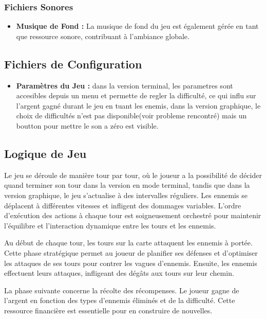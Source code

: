 \documentclass{article}
\begin{document}
\subsubsection*{Fichiers Sonores}

\begin{itemize}
    \item \textbf{Musique de Fond :} La musique de fond du jeu est également gérée en tant que ressource sonore, contribuant à l'ambiance globale.
\end{itemize}

\subsection{Fichiers de Configuration}

\begin{itemize}
    \item \textbf{Paramètres du Jeu :} dans la version terminal, les parametres sont accesibles depuis un menu et permette de regler la difficulté, ce qui influ sur l'argent gagné durant le jeu en tuant les enemis, dans la version graphique, le choix de difficultés n'est pas disponible(voir probleme rencontré) mais un boutton pour mettre le son a zéro est visible.
\end{itemize}


\subsection{Logique de Jeu}
Le jeu se déroule de manière tour par tour, où le joueur a la possibilité de décider quand terminer son tour dans la version en mode terminal, tandis que dans la version graphique, le jeu s'actualise à des intervalles réguliers. Les ennemis se déplacent à différentes vitesses et infligent des dommages variables. L'ordre d'exécution des actions à chaque tour est soigneusement orchestré pour maintenir l'équilibre et l'interaction dynamique entre les tours et les ennemis.

Au début de chaque tour, les tours sur la carte attaquent les ennemis à portée. Cette phase stratégique permet au joueur de planifier ses défenses et d'optimiser les attaques de ses tours pour contrer les vagues d'ennemis. Ensuite, les ennemis effectuent leurs attaques, infligeant des dégâts aux tours sur leur chemin.

La phase suivante concerne la récolte des récompenses. Le joueur gagne de l'argent en fonction des types d'ennemis éliminés et de la difficulté. Cette ressource financière est essentielle pour en construire de nouvelles.
\end{document}
